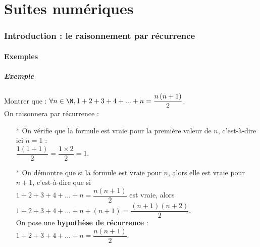 \ifdefined\COMPLETE
\else
    
    
\fi




\vspace*{-1cm}

\part{Suites numériques}

\section{Introduction : le raisonnement par récurrence}

\subsection{Exemples}

\subsubsection{Exemple }

Montrer que : $\forall n \in \N, 1 + 2 + 3 + 4 + ... + n = \dfrac{n\left(n+1\right)}{2}$. \\

On raisonnera par récurrence :

\begin{itemize}

\item[*] On vérifie que la formule est vraie pour la première valeur de $n$, c'est-à-dire ici $n = 1$ : \vspace{.3cm} \\ $\dfrac{1\left(1+1\right)}{2} = \dfrac{1\times 2}{2} = 1$. \\

\item[*] On démontre que si la formule est vraie pour $n$, alors elle est vraie pour $n+1$, c'est-à-dire que si \\ $1 + 2 + 3 + 4 + ... + n = \dfrac{n\left(n+1\right)}{2}$ est vraie, alors $1 + 2 + 3 + 4 + ... + n + \left(n + 1\right) = \dfrac{\left(n+1\right)\left(n+2\right)}{2}$. \vspace{.3cm} \\ On pose une \textbf{hypothèse de récurrence} : $1 + 2 + 3 + 4 + ... + n = \dfrac{n\left(n+1\right)}{2}$.
\end{itemize}

